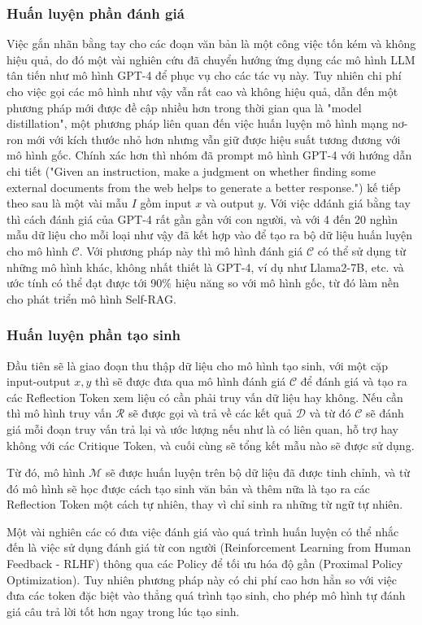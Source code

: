 \documentclass{article}
\begin{document}
\subsubsection{Huấn luyện phần đánh giá}
Việc gắn nhãn bằng tay cho các đoạn văn bản là một công việc tốn kém và không hiệu quả, do đó một vài nghiên cứu đã chuyển hướng ứng dụng các mô hình LLM tân tiến như mô hình GPT-4 để phục vụ cho các tác vụ này. Tuy nhiên chi phí cho việc gọi các mô hình như vậy vẫn rất cao và không hiệu quả, dẫn đến một phương pháp mới được đề cập nhiều hơn trong thời gian qua là "model distillation", một phương pháp liên quan đến việc huấn luyện mô hình mạng nơ-ron mới với kích thước nhỏ hơn nhưng vẫn giữ được hiệu suất tương đương với mô hình gốc. Chính xác hơn thì nhóm đã prompt mô hình GPT-4 với hướng dẫn chi tiết ("Given an instruction, make a
judgment on whether finding some external documents from the web helps to generate a better
response.") kế tiếp theo sau là một vài mẫu $I$ gồm input $x$ và output $y$. Với việc dđánh giá bằng tay thì cách đánh giá của GPT-4 rất gần gần với con người, và với 4 đến 20 nghìn mẫu dữ liệu cho mỗi loại như vậy đã kết hợp vào để tạo ra bộ dữ liệu huấn luyện cho mô hình $\mathcal{C}$. Với phương pháp này thì mô hình đánh giá $\mathcal{C}$ có thể sử dụng từ những mô hình khác, không nhất thiết là GPT-4, ví dụ như Llama2-7B, etc. và ước tính có thể đạt được tới 90\% hiệu năng so với mô hình gốc, từ đó làm nền cho phát triển mô hình Self-RAG. 

\subsubsection{Huấn luyện phần tạo sinh}
Đầu tiên sẽ là giao đoạn thu thập dữ liệu cho mô hình tạo sinh, với một cặp input-output $x,y$ thì sẽ được đưa qua mô hình đánh giá $\mathcal{C}$ để đánh giá và tạo ra các Reflection Token xem liệu có cần phải truy vấn dữ liệu hay không. Nếu cần thì mô hình truy vấn $\mathcal{R}$ sẽ được gọi và trả về các kết quả $\mathcal{D}$ và từ đó $\mathcal{C}$ sẽ đánh giá mỗi đoạn truy vấn trả lại và ước lượng nếu như là có liên quan, hỗ trợ hay không với các Critique Token, và cuối cùng sẽ tổng kết mẫu nào sẽ được sử dụng. 

Từ đó, mô hình $\mathcal{M}$ sẽ được huấn luyện trên bộ dữ liệu đã được tinh chỉnh, và từ đó mô hình sẽ học được cách tạo sinh văn bản và thêm nữa là tạo ra các Reflection Token một cách tự nhiên, thay vì chỉ sinh ra những từ ngữ tự nhiên. 

Một vài nghiên các có đưa việc đánh giá vào quá trình huấn luyện có thể nhắc đến là việc sử dụng đánh giá từ con người (Reinforcement Learning from Human Feedback - RLHF) thông qua các Policy để tối ưu hóa độ gần (Proximal Policy Optimization). Tuy nhiên phương pháp này có chi phí cao hơn hẳn so với việc đưa các token đặc biệt vào thẳng quá trình tạo sinh, cho phép mô hình tự đánh giá câu trả lời tốt hơn ngay trong lúc tạo sinh. 
\end{document}

